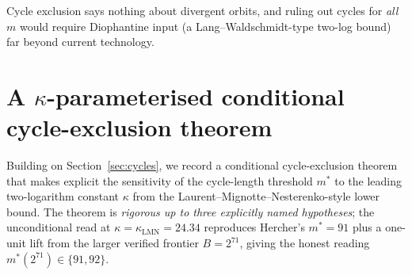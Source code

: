 \documentclass[11pt]{amsart}
\theoremstyle{definition}
\theoremstyle{remark}
\begin{document}
Cycle exclusion says nothing about divergent orbits, and ruling out cycles for \emph{all} $m$ would
require Diophantine input (a Lang--Waldschmidt-type two-log bound) far beyond current technology.

\section{A $\kappa$-parameterised conditional cycle-exclusion theorem}
\label{sec:cyclekappa}


Building on Section~\ref{sec:cycles}, we record a conditional cycle-exclusion theorem that makes
explicit the sensitivity of the cycle-length threshold $m^*$ to the leading two-logarithm
constant $\kappa$ from the Laurent--Mignotte--Nesterenko-style lower bound. The theorem is
\emph{rigorous up to three explicitly named hypotheses}; the unconditional read at
$\kappa=\kappa_{\mathrm{LMN}}=24.34$ reproduces Hercher's $m^*=91$ plus a one-unit lift from
the larger verified frontier $B=2^{71}$, giving the honest reading $m^*(2^{71})\in\{91,92\}$.
\end{document}

